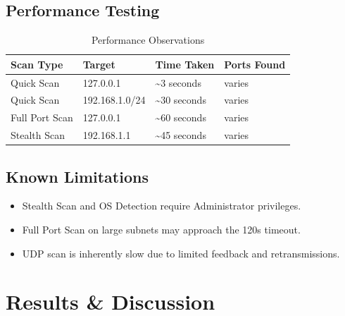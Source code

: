 \documentclass[12pt, a4paper]{report}
\begin{document}
\section{Performance Testing}
\begin{table}[H]
  \centering
  \caption{Performance Observations}
  \label{tab:perf}
  \begin{tabularx}{\textwidth}{@{}X X X X@{}}
    \toprule
    \textbf{Scan Type} & \textbf{Target} & \textbf{Time Taken} & \textbf{Ports Found} \\
    \midrule
    Quick Scan & 127.0.0.1 & \textasciitilde 3 seconds & varies \\
    Quick Scan & 192.168.1.0/24 & \textasciitilde 30 seconds & varies \\
    Full Port Scan & 127.0.0.1 & \textasciitilde 60 seconds & varies \\
    Stealth Scan & 192.168.1.1 & \textasciitilde 45 seconds & varies \\
    \bottomrule
  \end{tabularx}
\end{table}

\section{Known Limitations}
\begin{itemize}[leftmargin=2.2em]
  \item Stealth Scan and OS Detection require Administrator privileges.
  \item Full Port Scan on large subnets may approach the 120s timeout.
  \item UDP scan is inherently slow due to limited feedback and retransmissions.
\end{itemize}

\clearpage
\chapter{Results \& Discussion}
\end{document}
